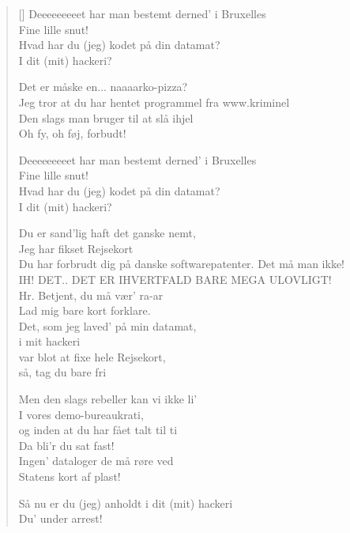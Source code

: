 \begin{multicols}
\begin{verse}[\versewidth]
  Deeeeeeeeet har man bestemt derned' i Bruxelles \\
  Fine lille snut! \\
  Hvad har du (jeg) kodet på din datamat? \\
  I dit (mit) hackeri?

Det er måske en... naaaarko-pizza?\\
  Jeg tror at du har hentet programmel 
  fra www.kriminel \\
  Den slags man bruger til at slå ihjel \\
  Oh fy, oh føj, forbudt! 

  Deeeeeeeeet har man bestemt derned' i Bruxelles \\
  Fine lille snut! \\
  Hvad har du (jeg) kodet på din datamat? \\
  I dit (mit) hackeri?

Du er sand'lig haft det ganske nemt, \\
Jeg har fikset Rejsekort \\
Du har forbrudt dig på danske softwarepatenter. Det må man ikke!\\
IH! DET.. DET ER IHVERTFALD BARE MEGA ULOVLIGT!\\
Hr. Betjent, du må vær' ra-ar \\
Lad mig bare kort forklare. \\
Det, som jeg laved' på min datamat, \\
i mit hackeri \\
var blot at fixe hele Rejsekort, \\
så, tag du bare fri 

Men den slags rebeller kan vi ikke li' \\
I vores demo-bureaukrati, \\
og inden at du har fået talt til ti \\
Da bli'r du sat fast! \\
Ingen' dataloger de må røre ved \\
Statens kort af plast! 

  Så nu er du (jeg) anholdt i dit (mit) hackeri \\
  Du' under arrest!

\end{verse}
\end{multicols}

